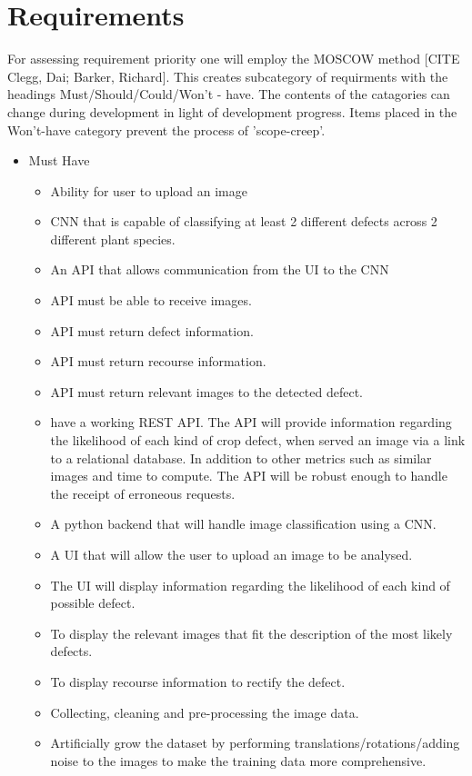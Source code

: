 \section{Requirements}
For assessing requirement priority one will employ the MOSCOW method [CITE Clegg, Dai; Barker, Richard]. This creates subcategory of requirments with the headings Must/Should/Could/Won't - have. The contents of the catagories can change during development in light of development progress. Items placed in the Won't-have category prevent the process of 'scope-creep'.
\begin{itemize}
  \item Must Have
  \begin{itemize}
    \item Ability for user to upload an image
    \item CNN that is capable of classifying at least 2 different defects
      across 2 different plant species.
    \item An API that allows communication from the UI to the CNN
    \item API must be able to receive images.
    \item API must return defect information.
    \item API must return recourse information.
    \item API must return relevant images to the detected defect.
  	\item have a working REST API. The API will provide information regarding the likelihood of each kind of crop defect, when served an image via a link to a relational database. In addition to other metrics such as similar images and time to compute. The API will be robust enough to handle the receipt of erroneous requests.
  	\item A python backend that will handle image classification using a CNN.
  	\item A UI that will allow the user to upload an image to be analysed.
  	\item The UI will display information regarding the likelihood of each kind of possible defect.
  	\item To display the relevant images that fit the description of the most likely defects.
  	\item To display recourse information to rectify the defect.
  	\item Collecting, cleaning and pre-processing the image data.
    \item Artificially grow the dataset by performing translations/rotations/adding noise to the images to make the training data more comprehensive.

\end{itemize}
\end{itemize}
